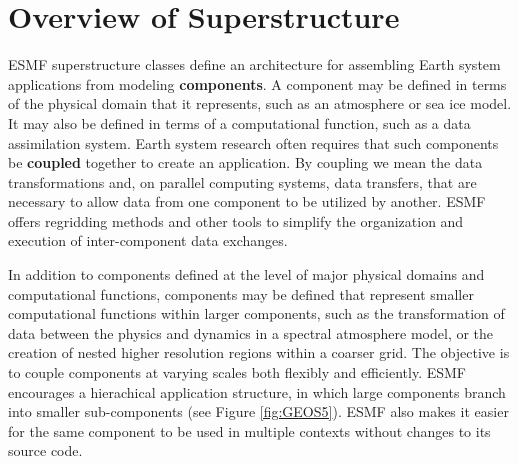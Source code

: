 %

\section{Overview of Superstructure}

ESMF superstructure classes define an architecture for assembling
Earth system applications from modeling {\bf components}.  A component
may be defined in terms of the physical domain that it represents,
such as an atmosphere or sea ice model.  It may also be defined in terms
of a computational function, such as a data assimilation system.
Earth system research often requires that such components be {\bf coupled} 
together to create an application.  By coupling we mean the data 
transformations and, on parallel computing systems, data transfers, 
that are necessary to allow data from one component to be utilized by 
another.  ESMF offers regridding methods and other tools to simplify 
the organization and execution of inter-component data exchanges.  

In addition to components defined at the level of major physical 
domains and computational functions, components may be defined that 
represent smaller computational functions within larger components, 
such as the transformation of data between the physics and dynamics 
in a spectral atmosphere model, 
or the creation of nested higher resolution regions 
within a coarser grid.  The objective is to couple components at varying 
scales both flexibly and efficiently.  ESMF encourages a hierachical
application structure, in which large components branch into 
smaller sub-components (see Figure \ref{fig:GEOS5}).  ESMF also makes 
it easier for the same component to be used in multiple contexts 
without changes to its source code.

